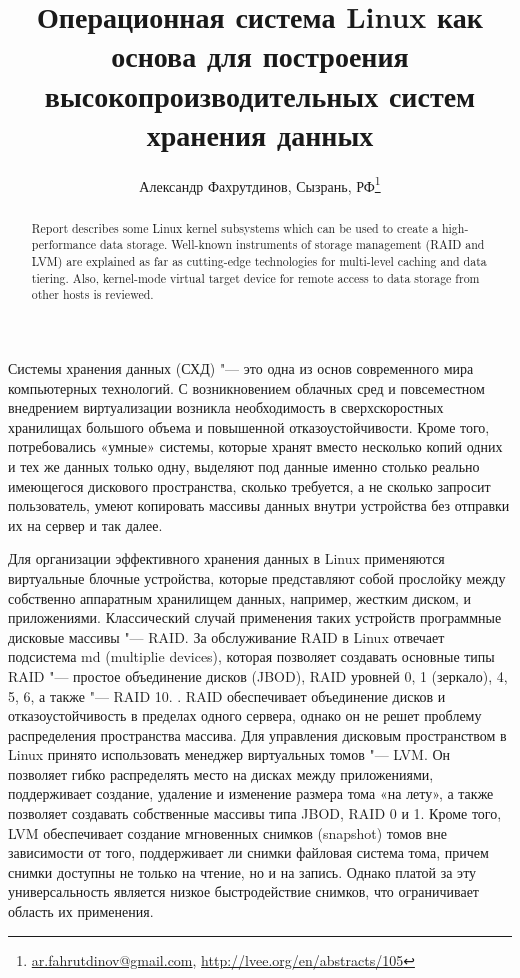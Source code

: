 \documentclass[10pt, a5paper]{article}
\begin{document}
\title{Операционная система Linux как основа для построения высокопроизводительных систем хранения данных}
\author{Александр Фахрутдинов, Сызрань, РФ\footnote{\url{ar.fahrutdinov@gmail.com}, \url{http://lvee.org/en/abstracts/105}}}
\maketitle
\begin{abstract}
Report describes some Linux kernel subsystems which can be used to create a high-performance data storage. Well-known instruments of storage management (RAID and LVM) are explained as far as cutting-edge technologies for multi-level caching and data tiering. Also, kernel-mode virtual target device  for remote access to data storage from other hosts is reviewed.
\end{abstract}
Системы хранения данных (СХД) "--- это одна из основ современного мира компьютерных технологий. С возникновением облачных сред и повсеместном внедрением виртуализации возникла необходимость в сверхскоростных хранилищах большого объема и повышенной  отказоустойчивости. Кроме того, потребовались «умные» системы, которые хранят вместо несколько копий одних и тех же данных только одну, выделяют под данные именно столько реально имеющегося дискового пространства, сколько требуется, а не сколько запросит пользователь, умеют копировать массивы данных внутри устройства без отправки их на сервер и так далее.

Для организации эффективного хранения данных в Linux применяются виртуальные блочные устройства, которые представляют собой прослойку между собственно аппаратным хранилищем данных, например, жестким диском, и приложениями. Классический случай применения таких устройств программные дисковые массивы "--- RAID. За   обслуживание  RAID в Linux отвечает подсистема md (multiplie devices), которая позволяет создавать основные типы RAID "--- простое объединение дисков (JBOD), RAID уровней 0, 1 (зеркало), 4, 5, 6, а также "--- RAID 10.
.
RAID обеспечивает объединение дисков и отказоустойчивость в пределах одного сервера, однако он не решет проблему распределения пространства массива. Для управления дисковым пространством в Linux принято использовать менеджер виртуальных томов "--- LVM. Он позволяет гибко распределять место на дисках между приложениями, поддерживает создание, удаление и изменение размера тома «на лету», а также позволяет создавать собственные массивы типа JBOD,  RAID 0 и 1. Кроме того, LVM обеспечивает создание мгновенных снимков (snapshot) томов вне зависимости от того, поддерживает ли снимки файловая система тома, причем снимки доступны не только на чтение, но и на запись.  Однако платой за эту универсальность является низкое быстродействие снимков, что ограничивает область их применения.
\end{document}
